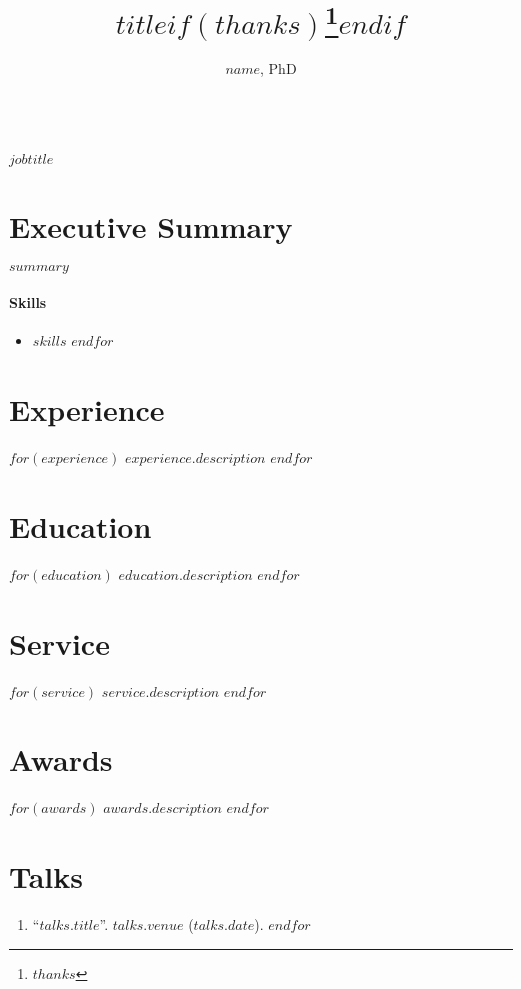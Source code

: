 \documentclass[11pt]{article}
\title{$title$$if(thanks)$\thanks{$thanks$}$endif$}
\author{$name$, PhD}
\date{}
\makeatletter
\renewcommand\maketitle{
    {\noindent\Large\sffamily\bfseries \@author\\
		\large\itshape $jobtitle$}
  }
\makeatother
\begin{document}
\maketitle
\thispagestyle{empty}

\section{Executive Summary}
\noindent $summary$
\paragraph{Skills} \begin{multicols}{3}
	\begin{itemize}
		$for(skills)$
		\item $skills$
		$endfor$
	\end{itemize}
\end{multicols}
\titlerule

\section*{Experience}
$for(experience)$
$experience.description$
$endfor$

\section*{Education}
$for(education)$
$education.description$
$endfor$

\section*{Service}
$for(service)$
$service.description$
$endfor$

\section*{Awards}
$for(awards)$
$awards.description$
$endfor$

\section*{Talks}
\begin{enumerate}
$for(talks)$
\item ``\href{$talks.link$}{$talks.title$}''. $talks.venue$ ($talks.date$).
$endfor$
\end{enumerate}
\end{document}
